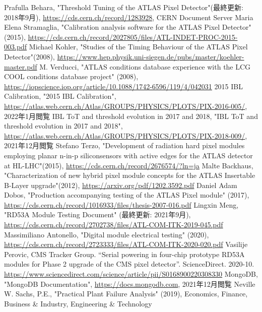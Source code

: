 \begin{thebibliography}{24}
Prafulla Behara, "Threshold Tuning of the ATLAS Pixel Detector"(最終更新: 2018年9月), \url{https://cds.cern.ch/record/1283928}, CERN Document Server
Maria Elena Stramaglia, "Calibration analysis software for the ATLAS Pixel Detector" (2015), \url{https://cds.cern.ch/record/2027805/files/ATL-INDET-PROC-2015-003.pdf}
Michael Kohler, "Studies of the Timing Behaviour of the ATLAS Pixel Detector"(2008), \url{https://www.hep.physik.uni-siegen.de/pubs/master/koehler-master.pdf}
M. Verducci, "ATLAS conditions database experience with the LCG COOL conditions database project" (2008),
\url{https://iopscience.iop.org/article/10.1088/1742-6596/119/4/042031}
2015 IBL Calibration, "2015 IBL Calibration", \url{https://atlas.web.cern.ch/Atlas/GROUPS/PHYSICS/PLOTS/PIX-2016-005/}, 2022年1月閲覧
IBL ToT and threshold evolution in 2017 and 2018, "IBL ToT and threshold evolution in 2017 and 2018", \url{https://atlas.web.cern.ch/Atlas/GROUPS/PHYSICS/PLOTS/PIX-2018-009/}, 2021年12月閲覧
Stefano Terzo, "Development of radiation hard pixel modules employing planar n-in-p siliconsensors with active edges for the ATLAS detector at HL-LHC"(2015), \url{https://cds.cern.ch/record/2676574/?ln=ja}
Malte Backhaus, "Characterization of new hybrid pixel module concepts for the ATLAS Insertable B-Layer upgrade"(2012), \url{https://arxiv.org/pdf/1202.3592.pdf}
Daniel Adam Dobos, "Production accompanying testing of the ATLAS Pixel module" (2017),
\url{https://cds.cern.ch/record/1016933/files/thesis-2007-016.pdf}
Lingxin Meng, "RD53A Module Testing Document" (最終更新: 2021年9月),
\url{https://cds.cern.ch/record/2702738/files/ATL-COM-ITK-2019-045.pdf}
Massimiliano Antonello, "Digital module electrical testing" (2020),
\url{https://cds.cern.ch/record/2723333/files/ATL-COM-ITK-2020-020.pdf}
Vasilije Perovic, CMS Tracker Group. “Serial powering in four-chip prototype RD53A modules for Phase 2 upgrade of the CMS pixel detector”. ScienceDirect. 2020-10. \url{https://www.sciencedirect.com/science/article/pii/S0168900220308330}
MongoDB, "MongoDB Documentation", \url{https://docs.mongodb.com}, 2021年12月閲覧
Neville W. Sachs, P.E., "Practical Plant Failure Analysis" (2019), Economics, Finance, Business \& Industry, Engineering \& Technology
\end{thebibliography}
